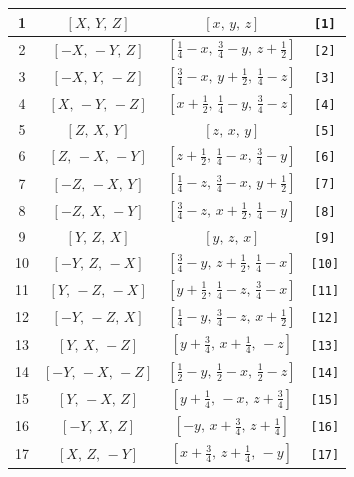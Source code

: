 \documentclass[fleqn,8pt]{jsarticle}
\begin{document}
\begin{longtable}{cccc}
1 & $\left[ X,\, Y,\, Z \right]$ & $\left[ x,\, y,\, z \right]$ & {\tt [1]} \\ \hline
2 & $\left[ - X,\, - Y,\, Z \right]$ & $\left[ \frac{1}{4} - x,\, \frac{3}{4} - y,\, z + \frac{1}{2} \right]$ & {\tt [2]} \\ \hline
3 & $\left[ - X,\, Y,\, - Z \right]$ & $\left[ \frac{3}{4} - x,\, y + \frac{1}{2},\, \frac{1}{4} - z \right]$ & {\tt [3]} \\ \hline
4 & $\left[ X,\, - Y,\, - Z \right]$ & $\left[ x + \frac{1}{2},\, \frac{1}{4} - y,\, \frac{3}{4} - z \right]$ & {\tt [4]} \\ \hline
5 & $\left[ Z,\, X,\, Y \right]$ & $\left[ z,\, x,\, y \right]$ & {\tt [5]} \\ \hline
6 & $\left[ Z,\, - X,\, - Y \right]$ & $\left[ z + \frac{1}{2},\, \frac{1}{4} - x,\, \frac{3}{4} - y \right]$ & {\tt [6]} \\ \hline
7 & $\left[ - Z,\, - X,\, Y \right]$ & $\left[ \frac{1}{4} - z,\, \frac{3}{4} - x,\, y + \frac{1}{2} \right]$ & {\tt [7]} \\ \hline
8 & $\left[ - Z,\, X,\, - Y \right]$ & $\left[ \frac{3}{4} - z,\, x + \frac{1}{2},\, \frac{1}{4} - y \right]$ & {\tt [8]} \\ \hline
9 & $\left[ Y,\, Z,\, X \right]$ & $\left[ y,\, z,\, x \right]$ & {\tt [9]} \\ \hline
10 & $\left[ - Y,\, Z,\, - X \right]$ & $\left[ \frac{3}{4} - y,\, z + \frac{1}{2},\, \frac{1}{4} - x \right]$ & {\tt [10]} \\ \hline
11 & $\left[ Y,\, - Z,\, - X \right]$ & $\left[ y + \frac{1}{2},\, \frac{1}{4} - z,\, \frac{3}{4} - x \right]$ & {\tt [11]} \\ \hline
12 & $\left[ - Y,\, - Z,\, X \right]$ & $\left[ \frac{1}{4} - y,\, \frac{3}{4} - z,\, x + \frac{1}{2} \right]$ & {\tt [12]} \\ \hline
13 & $\left[ Y,\, X,\, - Z \right]$ & $\left[ y + \frac{3}{4},\, x + \frac{1}{4},\, - z \right]$ & {\tt [13]} \\ \hline
14 & $\left[ - Y,\, - X,\, - Z \right]$ & $\left[ \frac{1}{2} - y,\, \frac{1}{2} - x,\, \frac{1}{2} - z \right]$ & {\tt [14]} \\ \hline
15 & $\left[ Y,\, - X,\, Z \right]$ & $\left[ y + \frac{1}{4},\, - x,\, z + \frac{3}{4} \right]$ & {\tt [15]} \\ \hline
16 & $\left[ - Y,\, X,\, Z \right]$ & $\left[ - y,\, x + \frac{3}{4},\, z + \frac{1}{4} \right]$ & {\tt [16]} \\ \hline
17 & $\left[ X,\, Z,\, - Y \right]$ & $\left[ x + \frac{3}{4},\, z + \frac{1}{4},\, - y \right]$ & {\tt [17]} \\ \hline

\end{longtable}
\end{document}
